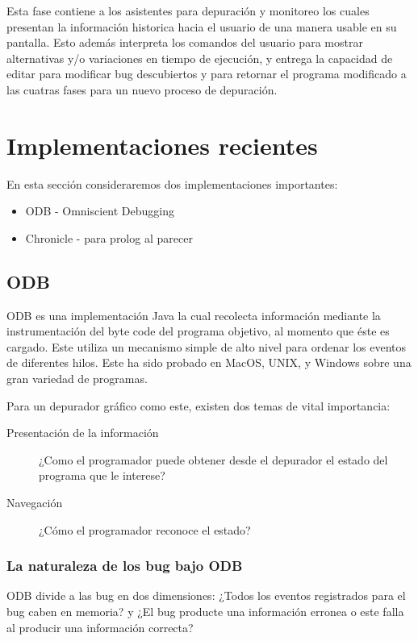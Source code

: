 \documentclass[12pt,a4paper]{report}
\begin{document}
Esta fase contiene a los asistentes para depuración y monitoreo los cuales presentan la información historica hacia el usuario de una manera usable en su pantalla.  Esto además interpreta los comandos del usuario para mostrar alternativas y/o variaciones en tiempo de ejecución, y entrega la capacidad de editar para modificar bug descubiertos y para retornar el programa modificado a las cuatras fases para un nuevo proceso de depuración.


	\section{Implementaciones recientes}

En esta sección consideraremos dos implementaciones importantes:
\begin{itemize}
	\item ODB - Omniscient Debugging
	\item Chronicle - para prolog al parecer
\end{itemize}

		\subsection{ODB}

ODB es una implementación Java la cual recolecta información mediante la instrumentación del byte code del programa objetivo, al momento que éste es cargado.  Este utiliza un mecanismo simple de alto nivel para ordenar los eventos de diferentes hilos.  Este ha sido probado en MacOS, UNIX, y Windows sobre una gran variedad de programas.

Para un depurador gráfico como este, existen dos temas de vital importancia:
\begin{description}
	\item[Presentación de la información] ¿Como el programador puede obtener desde el depurador el estado del programa que le interese?
	\item[Navegación] ¿Cómo el programador reconoce el estado?
\end{description} 

			\subsubsection{La naturaleza de los bug bajo ODB}

ODB divide a las bug en dos dimensiones:  ¿Todos los eventos registrados para el bug caben en memoria? y ¿El bug producte una información erronea o este falla al producir una información correcta?
\end{document}
